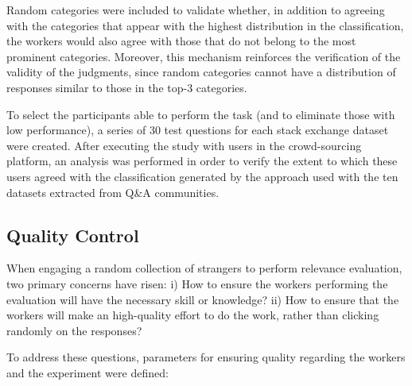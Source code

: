 Random categories were included to validate whether, in addition to agreeing with the categories that appear with the highest distribution in the classification, the workers would also agree with those that do not belong to the most prominent categories. Moreover, this mechanism reinforces the verification of the validity of the judgments, since random categories cannot have a distribution of responses similar to those in the top-3 categories.

To select the participants able to perform the task (and to eliminate those with low performance), a series of 30 test questions for each stack exchange dataset were created. After executing the study with users in the crowd-sourcing platform, an analysis was performed in order to verify the extent to which these users agreed with the classification generated by the approach used with the ten datasets extracted from Q\&A communities.


\subsection{\hspace*{3pt} Quality Control}

When engaging a random collection of strangers to perform relevance evaluation, two primary concerns have risen:  i) How to ensure the workers performing the evaluation will have the necessary skill or knowledge? ii) How to ensure that the workers will make an high-quality effort to do the work, rather than clicking randomly on the responses?

To address these questions, parameters for ensuring quality regarding the workers and the experiment were defined:

